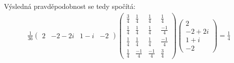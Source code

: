 \documentclass[12pt, a4paper]{article}
\begin{document}
Výsledná pravděpodobnost se tedy spočítá:
\begin{gather}
\frac{1}{36}
\begin{pmatrix}
2 & -2-2i & 1-i & -2
\end{pmatrix} \begin{pmatrix}
\frac{3}{4} & \frac{1}{4} & \frac{1}{4} & \frac{1}{4} \\
\frac{1}{4} & \frac{1}{4} & \frac{1}{4} & \frac{-1}{4} \\
\frac{1}{4} & \frac{1}{4} & \frac{1}{4} & \frac{-1}{4} \\
\frac{1}{4} & \frac{-1}{4} & \frac{-1}{4} & \frac{3}{4}
\end{pmatrix} \begin{pmatrix}
2\\
-2+2i\\
1+i\\
-2
\end{pmatrix} = \frac{1}{4}
\end{gather}
\end{document}
